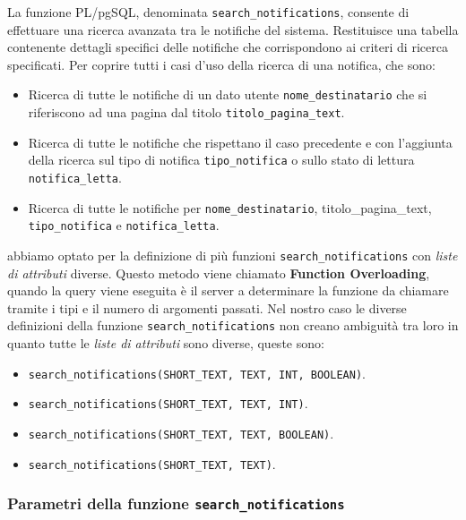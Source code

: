 \documentclass{article}
\begin{document}
La funzione PL/pgSQL, denominata \texttt{search\_notifications}, consente di effettuare una ricerca avanzata tra le notifiche del sistema. Restituisce una tabella contenente dettagli specifici delle notifiche che corrispondono ai criteri di ricerca specificati. 
Per coprire tutti i casi d'uso della ricerca di una notifica, che sono:
\begin{itemize}
	\item Ricerca di tutte le notifiche di un dato utente \texttt{nome\_destinatario} che si riferiscono ad una pagina dal titolo \texttt{titolo\_pagina\_text}.
	\item Ricerca di tutte le notifiche che rispettano il caso precedente e con l'aggiunta della ricerca sul tipo di notifica \texttt{tipo\_notifica} o sullo stato di lettura \texttt{notifica\_letta}.
	\item Ricerca di tutte le notifiche per \texttt{nome\_destinatario}, {titolo\_pagina\_text}, \texttt{tipo\_notifica} e \texttt{notifica\_letta}.  
\end{itemize}
abbiamo optato per la definizione di più funzioni \texttt{search\_notifications} con \textit{liste di attributi} diverse. Questo metodo viene chiamato \textbf{Function Overloading}, quando la query viene eseguita è il server a determinare la funzione da chiamare tramite i tipi e il numero di argomenti passati. Nel nostro caso le diverse definizioni della funzione \texttt{search\_notifications} non creano ambiguità tra loro in quanto tutte le \textit{liste di attributi} sono diverse, queste sono:
\begin{itemize}
 	\item \texttt{search\_notifications(SHORT\_TEXT, TEXT, INT, BOOLEAN)}.
 	\item \texttt{search\_notifications(SHORT\_TEXT, TEXT, INT)}.
 	\item \texttt{search\_notifications(SHORT\_TEXT, TEXT, BOOLEAN)}.
 	\item \texttt{search\_notifications(SHORT\_TEXT, TEXT)}.
 	\\
\end{itemize}

	
	    
	\subsubsection{Parametri della funzione \texttt{search\_notifications}}	
	
\end{document}
